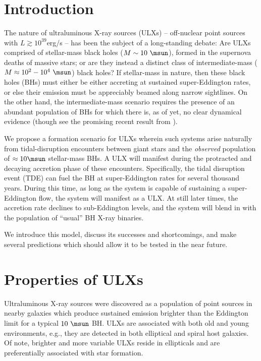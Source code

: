 \section{Introduction}\label{section:Intro}


The nature of ultraluminous X-ray sources (ULXs) -- off-nuclear point
sources with $L \gtrsim 10^{39}$erg/s -- has been the subject of a
long-standing debate: Are ULXs comprised of stellar-mass black holes 
($M \sim 10~\msun$), formed in the supernova deaths of massive stars; or
are they instead a distinct class of intermediate-mass ($M \approx 10^{2}-10^4~\msun$) black holes?  
If stellar-mass in nature, then
these black holes (BHs) must either be either accreting at sustained super-Eddington
rates, or else their emission must be appreciably beamed along narrow sightlines.    
On the other hand, the intermediate-mass scenario requires the presence of an
abundant population of BHs for which there is, as of yet, no clear
dynamical evidence (though see the promising recent result from
\citealt{Pasham_2014}).

We propose a formation scenario for ULXs wherein
such systems arise naturally from tidal-disruption encounters between
giant stars and the {\em observed} population of $\approx 10\msun$ stellar-mass BHs.  
A ULX will manifest during the protracted and decaying
accretion phase of these encounters.  Specifically, the tidal
disruption event (TDE) can fuel the BH at super-Eddington rates for
several thousand years.   During this time, as long as the system is capable of sustaining 
a super-Eddington flow, the system will manifest as a ULX.
At still later times, the accretion rate declines to sub-Eddington
levels, and the system will blend in with the population of
``usual'' BH X-ray binaries.

We introduce this model, discuss its successes and shortcomings, and make several predictions which should allow it to be tested in the near future.  

\section{Properties of ULXs}

Ultraluminous X-ray sources were discovered as a population of point sources in nearby galaxies which produce sustained emission brighter than the Eddington limit for a typical $10~\msun$ BH.   ULXs are associated with both old and young environments, e.g., they are detected in both elliptical and spiral host galaxies.  Of note, brighter and more variable ULXs reside in ellipticals and are preferentially associated with star formation.   


